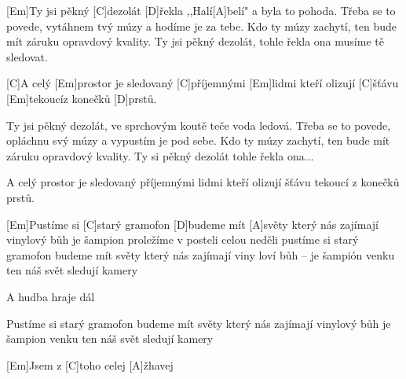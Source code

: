 
[Em]Ty jsi pěkný [C]dezolát
[D]\null řekla ,,Halí[A]belí"
a byla to pohoda.
Třeba se to povede,
vytáhnem tvý múzy 
a hodíme je za tebe.
Kdo ty múzy zachytí,
ten bude mít záruku
opravdový kvality.
Ty jsi pěkný dezolát,
tohle řekla ona
musíme tě sledovat.

[C]A celý [Em]prostor je sledovaný 
[C]příjemnými [Em]lidmi kteří olizují
[C]\null šťávu [Em]tekoucíz konečků [D]prstů.

Ty jsi pěkný dezolát,
ve sprchovým koutě
teče voda ledová.
Třeba se to povede,
opláchnu svý múzy
a vypustím je pod sebe.
Kdo ty múzy zachytí,
ten bude mít záruku
opravdový kvality.
Ty si pěkný dezolát
tohle řekla ona...
\slpc

A celý prostor je sledovaný 
příjemnými lidmi kteří olizují
šťávu tekoucí z konečků prstů.

[Em]Pustíme si [C]starý gramofon
[D]budeme mít [A]světy
který nás zajímají
vinylový bůh je šampion
proležíme v posteli
celou neděli
pustíme si starý gramofon
budeme mít světy
který nás zajímají
viny loví bůh – je šampión
venku ten náš svět 
sledují kamery

A hudba hraje dál

Pustíme si starý gramofon
budeme mít světy
který nás zajímají
vinylový bůh je šampion
venku ten náš svět 
sledují kamery

[Em]Jsem z [C]toho celej [A]\null žhavej